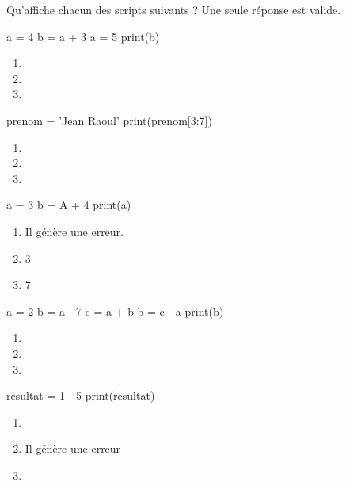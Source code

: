 \documentclass[a4paper,10pt]{article}
\begin{document}
Qu'affiche chacun des scripts suivants ? Une seule réponse est valide.
\begin{multicols}{2}

\begin{pythoncode}
a = 4
b = a + 3
a = 5
print(b)
\end{pythoncode}
\begin{enumerate}[\case\ \ a.]
\item {}
\item {}
\item    {}

\end{enumerate}

\begin{pythoncode}
prenom = 'Jean Raoul'
print(prenom[3:7])
\end{pythoncode}
\begin{enumerate}[\case\ \ a.]
\item    {}
\item    {}
\item    {}

\end{enumerate}

\begin{pythoncode}
a = 3
b = A + 4
print(a)
\end{pythoncode}

\begin{enumerate}[\case\ \ a.]
\item    Il génère une erreur.
\item    3
\item    7
\end{enumerate}

\columnbreak
\begin{pythoncode}
a = 2
b = a - 7
c = a + b
b = c - a
print(b)
\end{pythoncode}
\begin{enumerate}[\case\ \ a.]
\item {}
\item {}
\item {}
\end{enumerate}

\begin{pythoncode}
resultat = 1 - 5 %
print(resultat)
\end{pythoncode}

\begin{enumerate}[\case\ \ a.]
\item {}
\item Il génère une erreur
\item {}


\end{enumerate}
\end{multicols}
\end{document}
